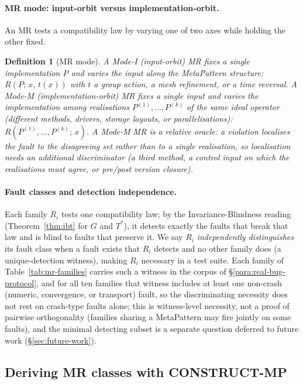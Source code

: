 \documentclass[acmsmall,screen,review]{acmart}
\newtheorem{definition}{Definition}
\begin{document}
\paragraph{MR mode: input-orbit versus implementation-orbit.} An MR tests a compatibility law by varying one of two axes while holding the other fixed.

\begin{definition}[MR mode]
\label{def:mr-mode}
A \emph{Mode-I} (input-orbit) MR fixes a single implementation $P$ and varies the input along the MetaPattern structure: $R(P;\,x,\,t(x))$ with $t$ a group action, a mesh refinement, or a time reversal. A \emph{Mode-M} (implementation-orbit) MR fixes a single input and varies the implementation among realisations $P^{(1)},\dots,P^{(k)}$ of the same ideal operator (different methods, drivers, storage layouts, or parallelisations): $R(P^{(1)},\dots,P^{(k)};\,x)$. A Mode-M MR is a relative oracle: a violation localises the fault to the disagreeing set rather than to a single realisation, so localisation needs an additional discriminator (a third method, a control input on which the realisations must agree, or pre/post version closure).
\end{definition}

\paragraph{Fault classes and detection independence.} Each family $R_i$ tests one compatibility law; by the Invariance-Blindness reading (Theorem~\ref{thm:ibt} for $G$ and $T^{*}$), it detects exactly the faults that break that law and is blind to faults that preserve it. We say $R_i$ \emph{independently distinguishes} its fault class when a fault exists that $R_i$ detects and no other family does (a unique-detection witness), making $R_i$ necessary in a test suite. Each family of Table~\ref{tab:mr-families} carries such a witness in the corpus of \S\ref{para:real-bug-protocol}, and for all ten families that witness includes at least one non-crash (numeric, convergence, or transport) fault, so the discriminating necessity does not rest on crash-type faults alone; this is witness-level necessity, not a proof of pairwise orthogonality (families sharing a MetaPattern may fire jointly on some faults), and the minimal detecting subset is a separate question deferred to future work (\S\ref{sec:future-work}).

\subsection{Deriving MR classes with CONSTRUCT-MP}
\label{sec:framework}
\end{document}
